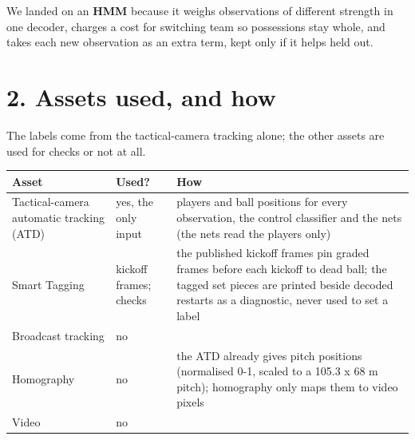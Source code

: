 \documentclass[11pt,a4paper]{article}
\begin{document}
We landed on an \textbf{HMM} because it weighs observations of different strength in one decoder, charges a cost for switching team so possessions stay whole, and takes each new observation as an extra term, kept only if it helps held out.

\section{2. Assets used, and how}

The labels come from the tactical-camera tracking alone; the other assets are used for checks or not at all.

\begin{center}
\small
\begin{tabularx}{\linewidth}{@{}>{\raggedright\arraybackslash}p{38mm}>{\raggedright\arraybackslash}p{26mm}>{\raggedright\arraybackslash}X@{}}
\toprule
\sffamily\bfseries Asset & \sffamily\bfseries Used? & \sffamily\bfseries How \\
\midrule
Tactical-camera automatic tracking (ATD) & yes, the only input & players and ball positions for every observation, the control classifier and the nets (the nets read the players only) \\
Smart Tagging & kickoff frames; checks & the published kickoff frames pin graded frames before each kickoff to dead ball; the tagged set pieces are printed beside decoded restarts as a diagnostic, never used to set a label \\
Broadcast tracking & no & \\
Homography & no & the ATD already gives pitch positions (normalised 0-1, scaled to a 105.3 x 68 m pitch); homography only maps them to video pixels \\
Video & no & \\
\bottomrule
\end{tabularx}
\end{center}
\end{document}
